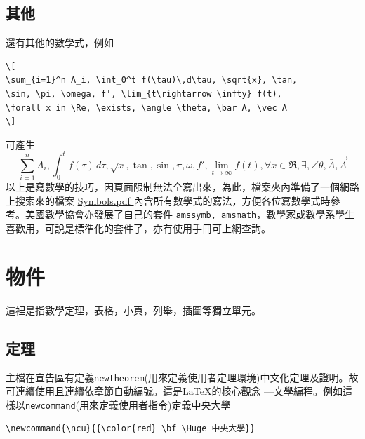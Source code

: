\subsection{其他}
還有其他的數學式，例如
\begin{Verbatim}[frame=single,firstline=1,label=Various math forms]
\[
\sum_{i=1}^n A_i, \int_0^t f(\tau)\,d\tau, \sqrt{x}, \tan, 
\sin, \pi, \omega, f', \lim_{t\rightarrow \infty} f(t),
\forall x in \Re, \exists, \angle \theta, \bar A, \vec A
\]
\end{Verbatim}
可產生   
\[
\sum_{i=1}^n A_i,  \int_0^t f(\tau)\,d\tau, \sqrt{x}, \tan, \sin, \pi, \omega, f',
\lim_{t\rightarrow \infty} f(t),
\forall x \in \Re, \exists, \angle \theta, \bar A, \vec A
\]
以上是寫數學的技巧，因頁面限制無法全寫出來，為此，檔案夾內準備了一個網路上搜索來的檔案
\href{./Symbols.pdf}{ Symbols.pdf }內含所有數學式的寫法，方便各位寫數學式時參考。美國數學協會亦發展了自己的套件
{\tt amssymb, amsmath}，數學家或數學系學生喜歡用，可說是標準化的套件了，亦有使用手冊可上網查詢。
\section{物件}
這裡是指數學定理，表格，小頁，列舉，插圖等獨立單元。

\subsection{定理}
主檔在宣告區有定義{\tt newtheorem}(用來定義使用者定理環境)中文化定理及證明。故可連續使用且連續依章節自動編號。這是\LaTeX{}的核心觀念 ---文學編程。例如這樣以{\tt newcommand}(用來定義使用者指令)定義中央大學

\begin{Verbatim}[frame=single,firstline=1,label=Simple macro without parameters]
\newcommand{\ncu}{{\color{red} \bf \Huge 中央大學}}
\end{Verbatim}

